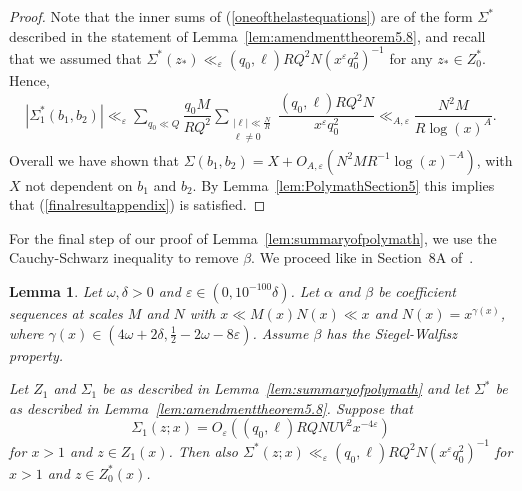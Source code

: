 \documentclass{amsart}
\newtheorem{lemma}{Lemma}
\numberwithin{equation}{section}
\begin{document}
\begin{proof}
\vspace{3mm}
Note that the inner sums of (\ref{oneofthelastequations}) are of the form $\Sigma^*$ described in the statement of  Lemma~\ref{lem:amendmenttheorem5.8}, and recall that we assumed that  $\Sigma^*(z_*) \ll_{ \varepsilon} (q_0,\ell) RQ^2N(x^\varepsilon q_0^2)^{-1} $ for any $z_* \in Z_0^*$.  Hence,
\begin{align*}
|\Sigma_1^*(b_1,b_2)| \ll_{ \varepsilon}  \sum_{q_0 \ll Q}\dfrac{q_0 M}{RQ^2}\sum_{\substack{ |\ell| \ll \frac{N}{R} \\ \ell \neq 0}}\dfrac{(q_0,\ell)RQ^2N}{x^{\varepsilon}q_0^{2}}\ll_{A, \varepsilon} \dfrac{N^2M}{R\log(x)^A}.
\end{align*}
Overall we have shown that $\Sigma(b_1,b_2) = X +O_{A, \varepsilon}(N^2MR^{-1}\log(x)^{-A})$, with $X$ not dependent on $b_1$ and $b_2$. By Lemma~\ref{lem:PolymathSection5} this implies that (\ref{finalresultappendix}) is satisfied.
\end{proof}
 
For the final step of our proof of Lemma~\ref{lem:summaryofpolymath}, we use the Cauchy-Schwarz inequality to remove $\beta$. We  proceed like in Section~8A of~\cite{Polymath:2014:EDZ}.  

\begin{lemma}  \label{lem:proofoflemma3-finalstep}
Let $\omega, \delta >0$ and $\varepsilon  \in (0, 10^{-100} \delta)$. Let $\alpha$ and $\beta$ be coefficient sequences at scales $M$ and $N$ with $x \ll M(x)N(x) \ll x$ and $N(x)= x^{\gamma(x)}$, where $\gamma(x) \in (4\omega+2\delta,\frac{1}{2}-2\omega-8\varepsilon)$.    Assume $\beta$ has the Siegel-Walfisz property. 

\vspace{3mm}
Let $Z_1$ and $\Sigma_1$ be as described in Lemma~{\rm\ref{lem:summaryofpolymath}} and let $\Sigma^*$ be as described in Lemma~{\rm\ref{lem:amendmenttheorem5.8}}. Suppose that $$\Sigma_1(z;x) = O_{\varepsilon}((q_0,\ell)RQN UV^2x^{-4\varepsilon}) $$ for  $x>1$ and $z \in Z_1(x)$.  Then also $\Sigma^*(z;x) \ll_{ \varepsilon} (q_0,\ell)RQ^2 N(x^\varepsilon q_0^2)^{-1}$ for   $x>1$ and $z \in Z_0^*(x)$.  
\end{lemma}
\end{document}
